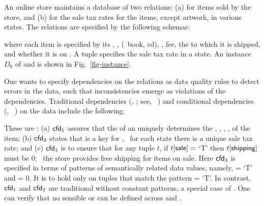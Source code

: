 \begin{example}
\label{exa-motivation}
An online store maintains a database of
two relations: (a)  for items sold
by the store, and (b)  for
the sale tax rates for the items, except artwork,
in various states.
The relations are specified by the following schemas:

\vspace{-.5ex}
 \vspace{-.5ex}




\noindent where
each item is specified by its , , 
(\eg~book, {\sc cd}), ,  fee,
the  to which it is shipped, and whether it
is on . A  tuple specifies the sale
tax rate in a state. An instance $D_0$ of  and  is shown
in Fig.~\ref{fig-instance}.

One wants to specify dependencies on the relations as data quality rules
to detect errors in the data, such that inconsistencies emerge as violations of
the dependencies. Traditional dependencies (\FDs, \INDs; see, \eg~\cite{AbHuVi1995})
and conditional dependencies (\CFDs, \CINDs~\cite{CFDs,tcs-CINDs})
on the data include the following:

\vspace{-0.5ex}  \vspace{-.5ex}

\noindent These are \CFDs: (a) ${\mathsf{cfd}}_1$ assures that the 
of an  uniquely determines the , ,
, ,  of the item; (b) ${\mathsf{cfd}}_2$
states that  is a key for , \ie~for each state
there is a unique sale tax rate; and (c) ${\mathsf{cfd}}_3$ is to ensure
that for any  tuple $t$, if $t[\protect\mathsf{sale}] = $ `T' then
$t[\protect\mathsf{shipping}]$ must be $0$; \ie~the store provides free shipping
for items on sale. Here ${\mathsf{cfd}}_3$ is specified in terms of
patterns of semantically related data values, namely,  =
`T' and  = 0. It is to hold only on  tuples
that match the pattern  = `T'. In contrast, ${\mathsf{cfd}}_1$
and ${\mathsf{cfd}}_2$ are traditional \FDs without constant patterns, a
special case of \CFDs. One  can verify that no sensible \INDs or
\CINDs can be defined across  and .


\end{example}
